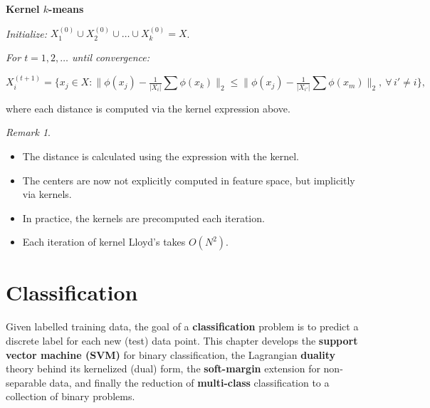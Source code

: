 \documentclass[
  letterpaper,
  DIV=11,
  numbers=noendperiod]{scrreprt}
\providecommand{\tightlist}{%
  \setlength{\itemsep}{0pt}\setlength{\parskip}{0pt}}
\theoremstyle{definition}
\theoremstyle{plain}
\theoremstyle{plain}
\theoremstyle{definition}
\theoremstyle{plain}
\theoremstyle{plain}
\theoremstyle{remark}
\newtheorem*{remark}{Remark}
\begin{document}
\begin{tcolorbox}[enhanced jigsaw, leftrule=.75mm, bottomrule=.15mm, left=2mm, colback=white, colframe=quarto-callout-note-color-frame, toprule=.15mm, breakable, arc=.35mm, rightrule=.15mm, opacityback=0]
\begin{minipage}[t]{5.5mm}
\textcolor{quarto-callout-note-color}{\faInfo}
\end{minipage}%
\begin{minipage}[t]{\textwidth - 5.5mm}

\textbf{Kernel \(k\)-means}

\emph{Initialize:}
\(X_1^{(0)} \cup X_2^{(0)} \cup \dots \cup X_k^{(0)} = X\).

\emph{For \(t = 1, 2, \dots\) until convergence:}

\[
X_i^{(t+1)} = \Big\{ x_j \in X : \big\| \phi(x_j) - \tfrac{1}{|X_i|} \textstyle\sum \phi(x_k) \big\|_2 \le \big\| \phi(x_j) - \tfrac{1}{|X_{i'}|} \textstyle\sum \phi(x_m) \big\|_2,\ \forall\, i' \ne i \Big\},
\]

where each distance is computed via the kernel expression above.

\end{minipage}%
\end{tcolorbox}

\begin{remark}
\leavevmode

\begin{itemize}
\tightlist
\item
  The distance is calculated using the expression with the kernel.
\item
  The centers are now not explicitly computed in feature space, but
  implicitly via kernels.
\item
  In practice, the kernels are precomputed each iteration.
\item
  Each iteration of kernel Lloyd's takes \(O(N^2)\).
\end{itemize}

\end{remark}

\chapter{Classification}\label{classification}

Given labelled training data, the goal of a \textbf{classification}
problem is to predict a discrete label for each new (test) data point.
This chapter develops the \textbf{support vector machine (SVM)} for
binary classification, the Lagrangian \textbf{duality} theory behind its
kernelized (dual) form, the \textbf{soft-margin} extension for
non-separable data, and finally the reduction of \textbf{multi-class}
classification to a collection of binary problems.
\end{document}
